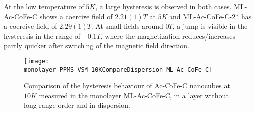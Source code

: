 \documentclass[\main/dresen_thesis.tex]{subfiles}
\begin{document}
  At the low temperature of $5 \unit{K}$, a large hysteresis is observed in both cases.
  ML-Ac-CoFe-C shows a coercive field of $2.21(1) \unit{T}$ at $5 \unit{K}$ and ML-Ac-CoFe-C-2* has a coercive field of $2.29(1) \unit{T}$.
  At small fields around $0 \unit{T}$, a jump is visible in the hysteresis in the range of $\pm 0.1 \unit{T}$, where the magnetization reduces/increases partly quicker after switching of the magnetic field direction.

  \begin{figure}[tb]
    \centering
    \texttt{[image: monolayer\_PPMS\_VSM\_10KCompareDispersion\_ML\_Ac\_CoFe\_C]}
    \caption{\label{fig:monolayer:magneticStructure:MLAcCoFeCCompareDispWafer}Comparison of the hysteresis behaviour of Ac-CoFe-C nanocubes at $10 \unit{K}$ measured in the monolayer ML-Ac-CoFe-C, in a layer without long-range order and in dispersion.}
  \end{figure}
\end{document}
